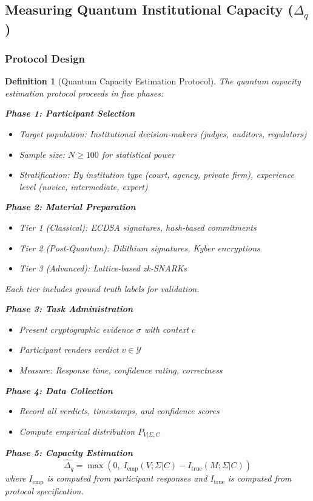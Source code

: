 \documentclass{ieeeaccess}
\newtheorem{definition}{Definition}[section]
\begin{document}
\subsection{Measuring Quantum Institutional Capacity ($\Delta_q$)}

\subsubsection{Protocol Design}

\begin{definition}[Quantum Capacity Estimation Protocol]
The quantum capacity estimation protocol proceeds in five phases:

\textbf{Phase 1: Participant Selection}
\begin{itemize}
    \item Target population: Institutional decision-makers (judges, auditors, regulators)
    \item Sample size: $N \geq 100$ for statistical power
    \item Stratification: By institution type (court, agency, private firm), experience level (novice, intermediate, expert)
\end{itemize}

\textbf{Phase 2: Material Preparation}
\begin{itemize}
    \item Tier 1 (Classical): ECDSA signatures, hash-based commitments
    \item Tier 2 (Post-Quantum): Dilithium signatures, Kyber encryptions
    \item Tier 3 (Advanced): Lattice-based zk-SNARKs
\end{itemize}

Each tier includes ground truth labels for validation.

\textbf{Phase 3: Task Administration}
\begin{itemize}
    \item Present cryptographic evidence $\sigma$ with context $c$
    \item Participant renders verdict $v \in \mathcal{Y}$
    \item Measure: Response time, confidence rating, correctness
\end{itemize}

\textbf{Phase 4: Data Collection}
\begin{itemize}
    \item Record all verdicts, timestamps, and confidence scores
    \item Compute empirical distribution $P_{V|\Sigma,C}$
\end{itemize}

\textbf{Phase 5: Capacity Estimation}
\begin{equation}
    \hat{\Delta}_q = \max\!\left(0,\; 
    I_{\text{emp}}(V; \Sigma|C) - I_{\text{true}}(M; \Sigma|C)\right)
    \label{eq:delta_q_estimator}
\end{equation}
where $I_{\text{emp}}$ is computed from participant responses and 
$I_{\text{true}}$ is computed from protocol specification.
\end{definition}
\end{document}
